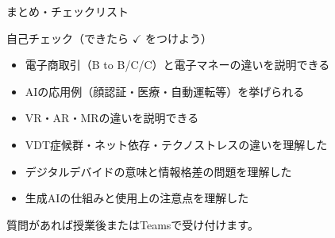 \documentclass[aspectratio=43,professionalfonts,handout,10pt]{beamer}
\begin{document}

\begin{frame}{まとめ・チェックリスト}
  \begin{block}{自己チェック（できたら $\checkmark$ をつけよう）}
    \begin{itemize}
      \item[$\square$] 電子商取引（B to B/C/C）と電子マネーの違いを説明できる
      \item[$\square$] AIの応用例（顔認証・医療・自動運転等）を挙げられる
      \item[$\square$] VR・AR・MRの違いを説明できる
      \item[$\square$] VDT症候群・ネット依存・テクノストレスの違いを理解した
      \item[$\square$] デジタルデバイドの意味と情報格差の問題を理解した
      \item[$\square$] 生成AIの仕組みと使用上の注意点を理解した
    \end{itemize}
  \end{block}

  \vfill

  {\small 質問があれば授業後またはTeamsで受け付けます。}
\end{frame}
\end{document}
